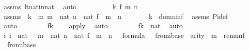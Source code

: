 \begin{isabellebody}
\ assms{}\ lt{\isacharunderscore}{\kern0pt}nat{\isacharunderscore}{\kern0pt}in{\isacharunderscore}{\kern0pt}nat\ \isamarkupfalse%
\ auto\isanewline
\ \ \isamarkupfalse%
\ \isanewline
\ \ \ \ \isamarkupfalse%
\ k\ f\ m\ n\ \isamarkupfalse%
\ assms{}\ {\isacharcolon}{\kern0pt}\ {\isachardoublequoteopen}k\ {\isasymnotin}\ m{\isachardoublequoteclose}\ {\isachardoublequoteopen}m\ {\isasymin}\ nat{\isachardoublequoteclose}\ {\isachardoublequoteopen}n\ {\isasymin}\ nat{\isachardoublequoteclose}\ {\isachardoublequoteopen}f\ {\isasymin}\ m\ {\isasymrightarrow}\ n{\isachardoublequoteclose}\isanewline
\ \ \ \ \isamarkupfalse%
\ \isamarkupfalse%
\ {\isachardoublequoteopen}k\ {\isasymnotin}\ domain{\isacharparenleft}{\kern0pt}f{\isacharparenright}{\kern0pt}{\isachardoublequoteclose}\ \isamarkupfalse%
\ assms{}\ Pi{\isacharunderscore}{\kern0pt}def\ \isamarkupfalse%
\ auto\ \isanewline
\ \ \ \ \isamarkupfalse%
\ \isamarkupfalse%
\ {\isachardoublequoteopen}f{\isacharbackquote}{\kern0pt}k\ {\isacharequal}{\kern0pt}\ {}{\isachardoublequoteclose}\ \isamarkupfalse%
\ apply{\isacharunderscore}{\kern0pt}{}\ \isamarkupfalse%
\ auto\ \isanewline
\ \ \ \ \isamarkupfalse%
\ \isamarkupfalse%
\ {\isachardoublequoteopen}f{\isacharbackquote}{\kern0pt}k\ {\isasymin}\ nat{\isachardoublequoteclose}\ \isamarkupfalse%
\ auto\isanewline
\ \ \isamarkupfalse%
\isanewline
\isanewline
\ \ \isamarkupfalse%
\ {\isachardoublequoteopen}{\isasymAnd}i{\isachardot}{\kern0pt}\ i\ {\isasymin}\ nat\ {\isasymLongrightarrow}\ \ {\isasymforall}m\ {\isasymin}\ nat{\isachardot}{\kern0pt}\ {\isasymforall}n\ {\isasymin}\ nat{\isachardot}{\kern0pt}\ {\isasymforall}f\ {\isasymin}\ m\ {\isasymrightarrow}\ n{\isachardot}{\kern0pt}\ {\isasymforall}{\isasymphi}\ {\isasymin}\ formula{\isachardot}{\kern0pt}\ {\isasymphi}\ {\isasymin}\ {\isasymDelta}{}{\isacharunderscore}{\kern0pt}from{\isacharcircum}{\kern0pt}i{\isacharparenleft}{\kern0pt}{\isasymDelta}{}{\isacharunderscore}{\kern0pt}base{\isacharparenright}{\kern0pt}\ {\isasymlongrightarrow}\ arity{\isacharparenleft}{\kern0pt}{\isasymphi}{\isacharparenright}{\kern0pt}\ {\isasymle}\ m\ {\isasymlongrightarrow}\ ren{\isacharparenleft}{\kern0pt}{\isasymphi}{\isacharparenright}{\kern0pt}{\isacharbackquote}{\kern0pt}m{\isacharbackquote}{\kern0pt}n{\isacharbackquote}{\kern0pt}f\ {\isasymin}\ {\isasymDelta}{}{\isacharunderscore}{\kern0pt}from{\isacharcircum}{\kern0pt}i{\isacharparenleft}{\kern0pt}{\isasymDelta}{}{\isacharunderscore}{\kern0pt}base{\isacharparenright}{\kern0pt}{\isachardoublequoteclose}\isanewline

\end{isabellebody}

